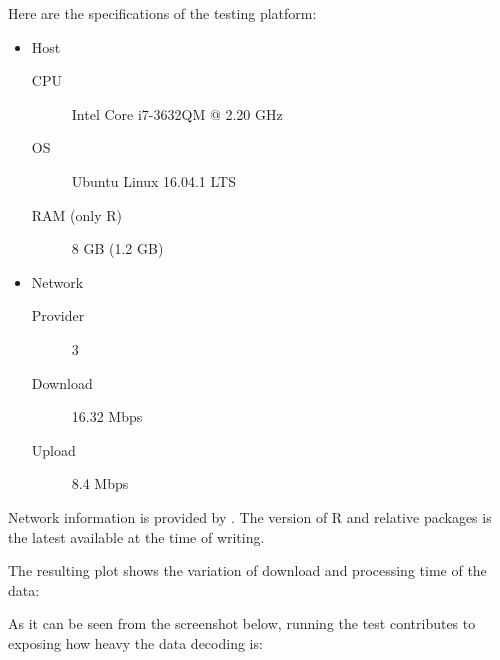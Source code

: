 Here are the specifications of the testing platform:
\begin{itemize}
	\item Host
	\begin{description}
		\item[CPU] Intel Core i7-3632QM @ 2.20 GHz
		\item[OS] Ubuntu Linux 16.04.1 LTS
		\item[RAM (only R)] 8 GB (1.2 GB)
	\end{description}
	\item Network
	\begin{description}
		\item[Provider] 3
		\item[Download] 16.32 Mbps
		\item[Upload] 8.4 Mbps
	\end{description}
\end{itemize}
Network information is provided by .
The version of R and relative packages is the latest available at the time of writing.

The resulting plot shows the variation of download and processing time of the data:



As it can be seen from the screenshot below, running the test contributes to exposing how heavy the data decoding is:

